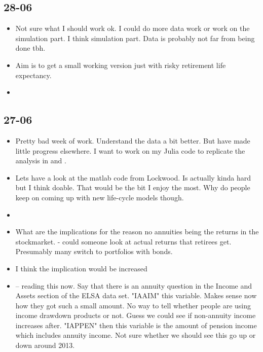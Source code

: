 \documentclass[12pt]{article}
\begin{document}
\subsection{\textbf{28-06}}
\begin{itemize}
      \item Not sure what I should work ok. I could do more data work or work on the simulation part.
            I think simulation part. Data is probably not far from being done tbh.

      \item Aim is to get a small working version just with risky retirement life expectancy.
      \item
\end{itemize}


\subsection{\textbf{27-06}}
\begin{itemize}
      \item Pretty bad week of work. Understand the data a bit better.
            But have made little progress elsewhere. I want to work on my Julia code
            to replicate the analysis in \cite{odea_sturrock_rest_2023} and \cite{lockwood_red_2012}.

      \item Lets have a look at the matlab code from Lockwood. Is actually kinda hard but I think doable.
            That would be the bit I enjoy the most.
            Why do people keep on coming up with new life-cycle models though.
      \item
      \item What are the implications for the reason no annuities being the returns in the stockmarket.
            - could someone look at actual returns that retirees get. Presumably many switch to portfolios with bonds.

      \item I think the implication would be increased
      \item \cite{inkman_et_al_rfs_2011} -- reading this now. Say that there is an annuity question in the
            Income and Assets section of the ELSA data set. "IAAIM" this variable. Makes sense now how they got
            such a small amount. No way to tell whether people are using income drawdown products or not.
            Guess we could see if non-annuity income increases after.  "IAPPEN" then this variable is the amount of
            pension income which includes annuity income. Not sure whether we should see this go up or down around 2013.

\end{itemize}
\end{document}
